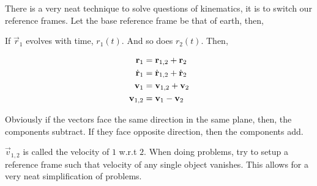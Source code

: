 There is a very neat technique to solve questions of kinematics, it is to switch our 
reference frames. Let the base reference frame be that of earth, then,

\begin{figure}
    [H]
    \centering
\end{figure}

If \(\vec{r}_1\) evolves with time, \(r_1(t)\). And so does \(r_2(t)\). Then,

\begin{align*}
    \boldsymbol{\mathbf{r}}_1 &= \boldsymbol{\mathbf{r}}_{1,2} + \boldsymbol{\mathbf{r}}_2 \\
    \dot{\boldsymbol{\mathbf{r}}}_1 &= \dot{\boldsymbol{\mathbf{r}}}_{1,2} + \dot{\boldsymbol{\mathbf{r}}}_2 \\
    \boldsymbol{\mathbf{v}}_1 &= \boldsymbol{\mathbf{v}}_{1,2} + \boldsymbol{\mathbf{v}}_{2}\\
    \boldsymbol{\mathbf{v}}_{1,2} &= \boldsymbol{\mathbf{v}}_1 - \boldsymbol{\mathbf{v}}_{2}
\end{align*}

Obviously if the vectors face the same direction in the same plane, then, the components subtract. If they face
opposite direction, then the components add. 

\(\vec{v}_{1,2}\) is called the velocity of \(\mathit{1}\) w.r.t \(\mathit{2}\). When doing
problems, try to setup a reference frame such that velocity of any single object vanishes.
This allows for a very neat simplification of problems. 




